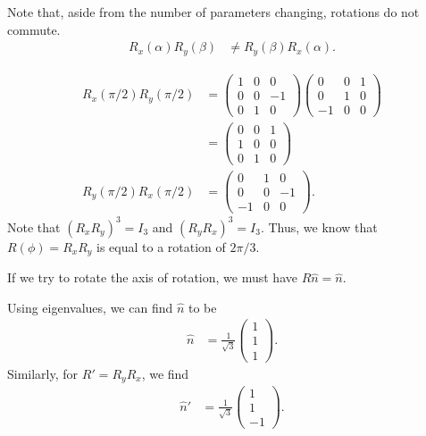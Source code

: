 \documentclass[10pt]{mypackage}
\begin{document}
Note that, aside from the number of parameters changing, rotations do not commute.
\begin{align*}
  R_x\left(\alpha\right)R_y\left(\beta\right) &\neq R_y\left(\beta\right)R_x\left(\alpha\right).
\end{align*}
\begin{example}
  \begin{align*}
    R_x\left(\pi/2\right)R_y\left(\pi/2\right) &= \begin{pmatrix}1 & 0 & 0\\ 0 & 0 & -1 \\ 0 & 1 & 0\end{pmatrix} \begin{pmatrix}0 & 0 & 1\\ 0 & 1 & 0 \\ -1 & 0 & 0\end{pmatrix}\\
                                               &= \begin{pmatrix}0 & 0 & 1 \\ 1 & 0 & 0 \\ 0 & 1 & 0\end{pmatrix}\\
    R_y\left(\pi/2\right)R_x\left(\pi/2\right) &= \begin{pmatrix}0 & 1 & 0 \\ 0 & 0 & -1 \\ -1 & 0 & 0\end{pmatrix}.
  \end{align*}
  Note that $\left(R_xR_y\right)^3 = I_3$ and $\left(R_yR_x\right)^3 = I_3$. Thus, we know that $R\left(\phi\right) = R_xR_y$ is equal to a rotation of $2\pi/3$.\newline

  If we try to rotate the axis of rotation, we must have $R\hat{n} = \hat{n}$.\newline

  Using eigenvalues, we can find $\hat{n}$ to be
  \begin{align*}
    \hat{n} &= \frac{1}{\sqrt{3}} \begin{pmatrix}1\\1\\1\end{pmatrix}.
  \end{align*}
  Similarly, for $R' = R_yR_x$, we find
  \begin{align*}
    \hat{n}' &= \frac{1}{\sqrt{3}}\begin{pmatrix}1\\1\\-1\end{pmatrix}.
  \end{align*}
\end{example}
\end{document}
